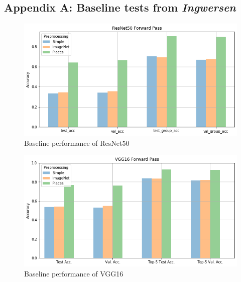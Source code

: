 \subsection*{Appendix A: Baseline tests from \textbf{\textit{Ingwersen}}\autocite{Ingwersen}}\label{appendix: A}
\begin{figure}[H]
    \centering
    \includegraphics[scale=0.5]{pictures/plots/resnet50_fc_acc}
    \caption{Baseline performance of ResNet50}
    \label{fig:baselineresnet}
\end{figure}
\begin{figure}[H]
    \centering
    \includegraphics[scale=0.5]{pictures/plots/vgg_fc_acc}
    \caption{Baseline performance of VGG16}
    \label{fig:baselinevgg}
\end{figure}
\begin{table}[H]
    \centering
\end{table}
